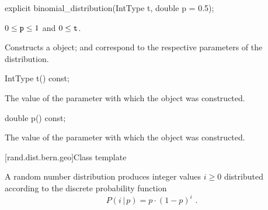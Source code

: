 %
\begin{itemdecl}
explicit binomial_distribution(IntType t, double p = 0.5);
\end{itemdecl}

\begin{itemdescr}
\pnum\requires
 $0 \leq \texttt{p} \leq 1$ and $0 \leq \texttt{t} $.

\pnum\effects Constructs a  object;
  and 
 correspond to the respective parameters of the distribution.
\end{itemdescr}

%
\begin{itemdecl}
IntType t() const;
\end{itemdecl}%
\begin{itemdescr}
\pnum\returns The value of the  parameter
 with which the object was constructed.
\end{itemdescr}

%
\begin{itemdecl}
double p() const;
\end{itemdecl}

\begin{itemdescr}
\pnum\returns The value of the  parameter
 with which the object was constructed.
\end{itemdescr}


[rand.dist.bern.geo]{Class template }
%
%

\pnum
A  random number distribution
produces integer values $i \geq 0$
distributed according to
the discrete probability function
%
%
\[ P(i\,|\,p) = p \cdot (1-p)^{i} \text{ .} \]

